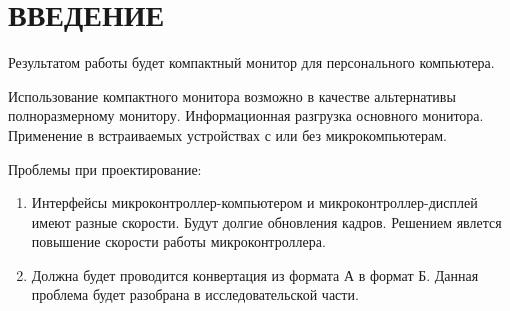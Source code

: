 \chapter*{ВВЕДЕНИЕ}

	Результатом работы будет компактный монитор для персонального компьютера.
	
	Использование компактного монитора возможно в качестве альтернативы полноразмерному монитору. Информационная разгрузка основного монитора. Применение в встраиваемых устройствах с или без микрокомпьютерам.
	
	Проблемы при проектирование:
	
	\begin{enumerate}
		\item Интерфейсы микроконтроллер-компьютером и микроконтроллер-дисплей имеют разные скорости. Будут долгие обновления кадров. Решением явлется повышение скорости работы микроконтроллера.
		\item Должна будет проводится конвертация из формата А в формат Б. Данная проблема будет разобрана в исследовательской части.
	\end{enumerate}